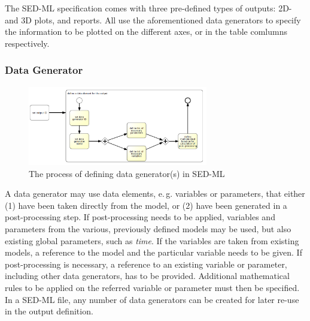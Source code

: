 The SED-ML specification comes with three pre-defined types of outputs: 2D- and 3D plots, and reports. All use the aforementioned data generators to specify the information to be plotted on the different axes, or in the table comlumns respectively.
\subsubsection{Data Generator}
\label{overview:dataGen}
%
\begin{figure}[h]
\centering
\includegraphics[width=0.7\textwidth]{images/bpmn/sedDataGeneratorOryx.png}
\caption{The process of defining data generator(s) in SED-ML}
\label{fig:workflowDataGenerator}
\end{figure}
%
A data generator may use data elements, e.\,g. variables or parameters, that either (1) have been taken directly from the model, or (2) have been generated in a post-processing step. If post-processing needs to be applied, variables and parameters from the various, previously defined models may be used, but also existing global parameters, such as \emph{time}.
If the variables are taken from existing models, a reference to the model and the particular variable needs to be given. 
If post-processing is necessary, a reference to an existing variable or parameter, including other data generators, has to be provided. Additional mathematical rules to be applied on the referred variable or parameter must then  be specified. 
%
In a SED-ML file, any number of data generators can be created for later re-use in the output definition.



